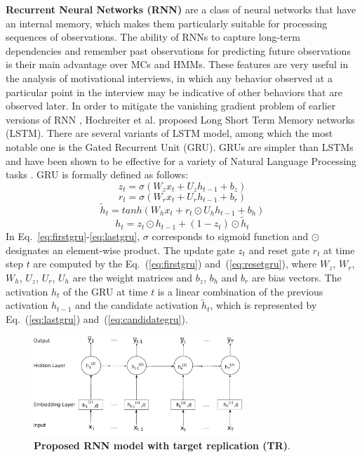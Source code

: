 \documentclass{amia_summit_2018}
\begin{document}
\textbf {Recurrent Neural Networks (RNN)} are a class of neural networks that have an internal memory, which makes them particularly suitable for processing sequences of observations. The ability of RNNs to capture long-term dependencies and remember past observations for predicting future observations is their main advantage over MCs and HMMs. These features are very useful in the analysis of motivational interviews, in which any behavior observed at a particular point in the interview may be indicative of other behaviors that are observed later. In order to mitigate the vanishing gradient problem of earlier versions of RNN \cite{bengio1993problem}, Hochreiter et al.\cite{hochreiter1997long} proposed Long Short Term Memory networks (LSTM). There are several variants of LSTM model, among which the most notable one is the Gated Recurrent Unit\cite{cho2014properties} (GRU). GRUs are simpler than LSTMs and have been shown to be effective for a variety of Natural Language Processing tasks \cite{cho2014properties}. GRU is formally defined as follows:
\begin{equation}
z_t = \sigma(W_zx_t + U_zh_{t-1} + b_z)
\label{eq:firstgru}
\end{equation}
\begin{equation}
r_t = \sigma(W_rx_t + U_rh_{t-1} + b_r)
\label{eq:resetgru}
\end{equation}
\begin{equation}
\tilde h_t = tanh(W_hx_t + r_t \odot U_hh_{t-1} + b_h) 
\label{eq:candidategru}
\end{equation}
\begin{equation}
h_t = z_t \odot h_{t-1} + (1-z_t) \odot \tilde h_t
\label{eq:lastgru}
\end{equation}  
In Eq.~\ref{eq:firstgru}-\ref{eq:lastgru}, $\sigma$ corresponds to sigmoid function and $\odot$ designates an element-wise product. The update gate $z_t$ and reset gate $r_t$ at time step $t$ are computed by the Eq.~(\ref{eq:firstgru}) and~(\ref{eq:resetgru}), where $W_z$, $W_r$, $W_h$, $U_z$, $U_r$, $U_h$ are the weight matrices and $b_z$, $b_h$ and $b_r$ are bias vectors. The activation $h_t$ of the GRU at time $t$ is a linear combination of the previous activation $h_{t-1}$ and the candidate activation $\tilde h_t$, which is represented by Eq.~(\ref{eq:lastgru}) and~(\ref{eq:candidategru}).
  
\begin{figure}[!htb]
    \centering
    \includegraphics[width=0.70\textwidth]{figures/rnn_small.eps}
    \caption{\textbf{Proposed RNN model with target replication (TR)}.}
    \label{fig:rnn-model}
\end{figure}
\end{document}
